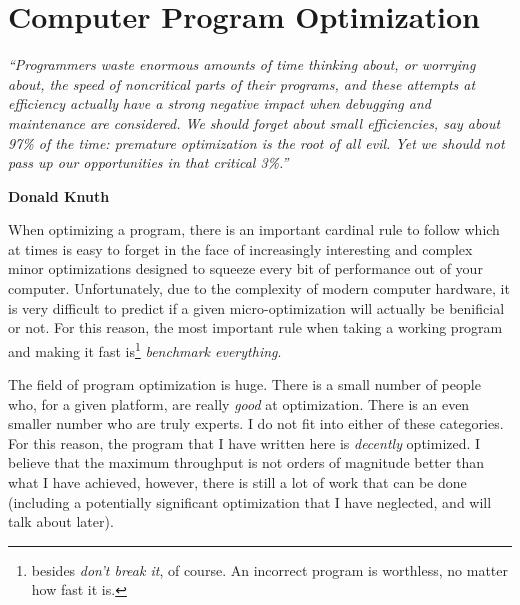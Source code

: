 \section{Computer Program Optimization} \label{app:opt}

\begin{addmargin}[16em]{0em}
	\begin{singlespace}
	{\footnotesize
	\textit{``Programmers waste enormous amounts of time thinking about, or worrying about, the speed of noncritical parts of their programs, and these attempts at efficiency actually have a strong negative impact when debugging and maintenance are considered. We should forget about small efficiencies, say about 97\% of the time: premature optimization is the root of all evil. Yet we should not pass up our opportunities in that critical 3\%.''}
		\begin{flushright}
		\textbf{Donald Knuth}
		\end{flushright}
	}
	\end{singlespace}
\end{addmargin}

When optimizing a program, there is an important cardinal rule to follow which at times
is easy to forget in the face of increasingly interesting and complex minor optimizations
designed to squeeze every bit of performance out of your computer. Unfortunately, due
to the complexity of modern computer hardware, it is
very difficult to predict if a given micro-optimization will actually be benificial or
not. For this reason, the most important rule when taking a working program and making it
fast is\footnote{besides \textit{don't break it}, of course. An incorrect program is worthless, no matter
how fast it is.} \textit{benchmark everything}.

The field of program optimization is huge. There is a small number of people who, for
a given platform, are really \textit{good} at optimization. There is an even smaller number
who are truly experts. I do not fit into either of these categories. For this reason, the program
that I have written here is \textit{decently} optimized. I believe that the maximum throughput
is not orders of magnitude better than what I have achieved, however, there is still a lot of work
that can be done (including a potentially significant optimization that I have neglected, and will talk
about later).


